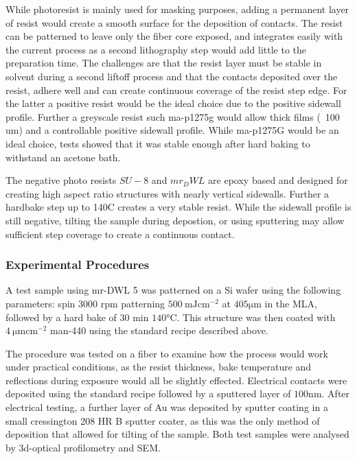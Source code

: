 While photoresist is mainly used for masking purposes, adding a permanent layer of resist would create a smooth surface for the deposition of contacts. The resist can be patterned to leave only the fiber core exposed, and integrates easily with the current process  as a second lithography step would add little to the preparation time. The challenges are that the resist layer must be stable in solvent during a second liftoff process and that the contacts deposited over the resist, adhere well and can create continuous coverage of the resist step edge. For the latter a positive resist would be the ideal choice due to the positive sidewall profile. Further a greyscale resist such ma-p1275g  would allow thick films (~100 um) and a controllable positive sidewall profile. While ma-p1275G would be an ideal choice, tests showed that it was stable enough after hard baking to withstand an acetone bath. 

The negative photo resists $SU-8$ and $mr_DWL$ are epoxy based and designed for creating high aspect ratio structures with nearly vertical sidewalls. Further a hardbake step up to 140C creates a very stable resist. While the sidewall profile is still negative, tilting the sample during depostion, or using sputtering may allow sufficient step coverage to create a continuous contact. 

\subsubsection{Experimental Procedures}
A test sample using mr-DWL 5 was patterned on a Si wafer using the following parameters: spin 3000 rpm patterning $\SI{500}{\milli \joule \cm^{-2}}$ at $405 \si{\micro\meter}$ in the MLA, followed by a hard bake of 30 min $140 \si{\celsius}$. This structure was then coated with $\SI{4}{\micro \meter \cm^{-2}}$ man-440 using the standard recipe described above. 

The procedure was tested on a fiber to examine how the process would work under practical conditions, as the resist thickness, bake temperature and reflections during exposure would all be slightly effected. Electrical contacts were deposited using the standard recipe followed by a sputtered layer of $100 \si{\nano \meter}$. After electrical testing, a further layer of Au was deposited by sputter coating in a small cressington 208 HR B sputter coater, as this was the only method of deposition that allowed for tilting of the sample. Both test samples were analysed by 3d-optical profilometry and SEM. 

